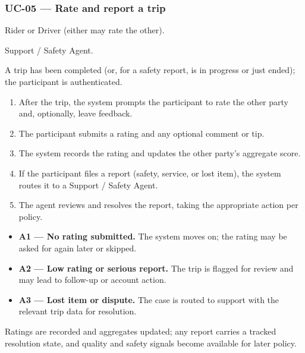 \subsubsection*{UC-05 --- Rate and report a trip}

\begin{description}[leftmargin=2.4cm,style=nextline,font=\normalfont\bfseries]
  \item[Primary actor] Rider or Driver (either may rate the other).
  \item[Secondary actors] Support / Safety Agent.
  \item[Preconditions] A trip has been completed (or, for a safety report, is
        in progress or just ended); the participant is authenticated.
  \item[Main flow]
    \begin{enumerate}[leftmargin=1.6em,itemsep=0.15em]
      \item After the trip, the system prompts the participant to rate the
            other party and, optionally, leave feedback.
      \item The participant submits a rating and any optional comment or tip.
      \item The system records the rating and updates the other party's
            aggregate score.
      \item If the participant files a report (safety, service, or lost
            item), the system routes it to a Support / Safety Agent.
      \item The agent reviews and resolves the report, taking the appropriate
            action per policy.
    \end{enumerate}
  \item[Alternative flows]
    \begin{itemize}[leftmargin=1.6em,itemsep=0.15em]
      \item \textbf{A1 --- No rating submitted.} The system moves on; the
            rating may be asked for again later or skipped.
      \item \textbf{A2 --- Low rating or serious report.} The trip is flagged
            for review and may lead to follow-up or account action.
      \item \textbf{A3 --- Lost item or dispute.} The case is routed to
            support with the relevant trip data for resolution.
    \end{itemize}
  \item[Postconditions] Ratings are recorded and aggregates updated; any
        report carries a tracked resolution state, and quality and safety
        signals become available for later policy.
\end{description}

